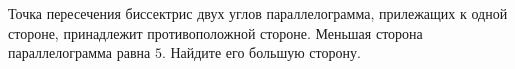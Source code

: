 \begin{ex}
	\begin{condition}
		Точка пересечения биссектрис двух углов параллелограмма, прилежащих к одной стороне, принадлежит противоположной стороне. Меньшая сторона параллелограмма равна \( 5 \). Найдите его большую сторону.
	\end{condition}
\end{ex}